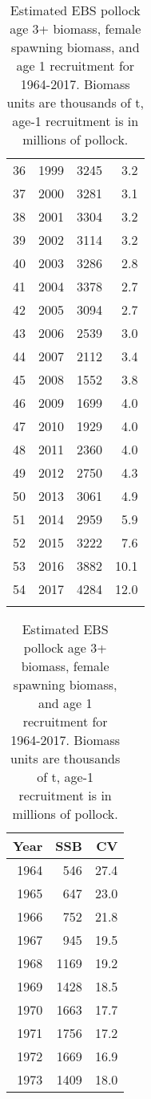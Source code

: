 \documentclass[]{article}
\begin{document}
\begin{longtable}{rrrr}
  36 & 1999 & 3245 & 3.2 \\ 
  37 & 2000 & 3281 & 3.1 \\ 
  38 & 2001 & 3304 & 3.2 \\ 
  39 & 2002 & 3114 & 3.2 \\ 
  40 & 2003 & 3286 & 2.8 \\ 
  41 & 2004 & 3378 & 2.7 \\ 
  42 & 2005 & 3094 & 2.7 \\ 
  43 & 2006 & 2539 & 3.0 \\ 
  44 & 2007 & 2112 & 3.4 \\ 
  45 & 2008 & 1552 & 3.8 \\ 
  46 & 2009 & 1699 & 4.0 \\ 
  47 & 2010 & 1929 & 4.0 \\ 
  48 & 2011 & 2360 & 4.0 \\ 
  49 & 2012 & 2750 & 4.3 \\ 
  50 & 2013 & 3061 & 4.9 \\ 
  51 & 2014 & 2959 & 5.9 \\ 
  52 & 2015 & 3222 & 7.6 \\ 
  53 & 2016 & 3882 & 10.1 \\ 
  54 & 2017 & 4284 & 12.0 \\ 
  \hline
\caption{ Estimated EBS pollock age 3+ biomass, female spawning biomass, and age 1
    recruitment for 1964-2017. Biomass units are thousands of t, age-1
    recruitment is in millions of pollock. } 
\label{tab:SSB}
\end{longtable}\begin{table}[ht]
\centering
\caption{ Estimated EBS pollock age 3+ biomass, female spawning biomass, and age 1
    recruitment for 1964-2017. Biomass units are thousands of t, age-1
    recruitment is in millions of pollock. } 
\label{tab:SSB}
\begin{tabular}{rrr}
  \hline
Year & SSB & CV \\ 
  \hline
1964 & 546 & 27.4 \\ 
  1965 & 647 & 23.0 \\ 
  1966 & 752 & 21.8 \\ 
  1967 & 945 & 19.5 \\ 
  1968 & 1169 & 19.2 \\ 
  1969 & 1428 & 18.5 \\ 
  1970 & 1663 & 17.7 \\ 
  1971 & 1756 & 17.2 \\ 
  1972 & 1669 & 16.9 \\ 
  1973 & 1409 & 18.0 \\ 

\end{tabular}
\end{table}
\end{document}
